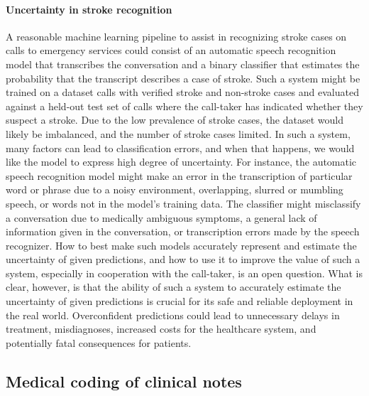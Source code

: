 \paragraph{Uncertainty in stroke recognition} A reasonable machine learning pipeline to assist in recognizing stroke cases on calls to emergency services could consist of an automatic speech recognition model that transcribes the conversation and a binary classifier that estimates the probability that the transcript describes a case of stroke. 
Such a system might be trained on a dataset calls with verified stroke and non-stroke cases and evaluated against a held-out test set of calls where the call-taker has indicated whether they suspect a stroke. Due to the low prevalence of stroke cases, the dataset would likely be imbalanced, and the number of stroke cases limited. 
In such a system, many factors can lead to classification errors, and when that happens, we would like the model to express high degree of uncertainty. 
For instance, the automatic speech recognition model might make an error in the transcription of particular word or phrase due to a noisy environment, overlapping, slurred or mumbling speech, or words not in the model's training data. 
The classifier might misclassify a conversation due to medically ambiguous symptoms, a general lack of information given in the conversation, or transcription errors made by the speech recognizer. 
How to best make such models accurately represent and estimate the uncertainty of given predictions, and how to use it to improve the value of such a system, especially in cooperation with the call-taker, is an open question.
What is clear, however, is that the ability of such a system to accurately estimate the uncertainty of given predictions is crucial for its safe and reliable deployment in the real world. Overconfident predictions could lead to unnecessary delays in treatment, misdiagnoses, increased costs for the healthcare system, and potentially fatal consequences for patients.


\subsection{Medical coding of clinical notes} \label{subsec:motivation-medical-coding}
%
